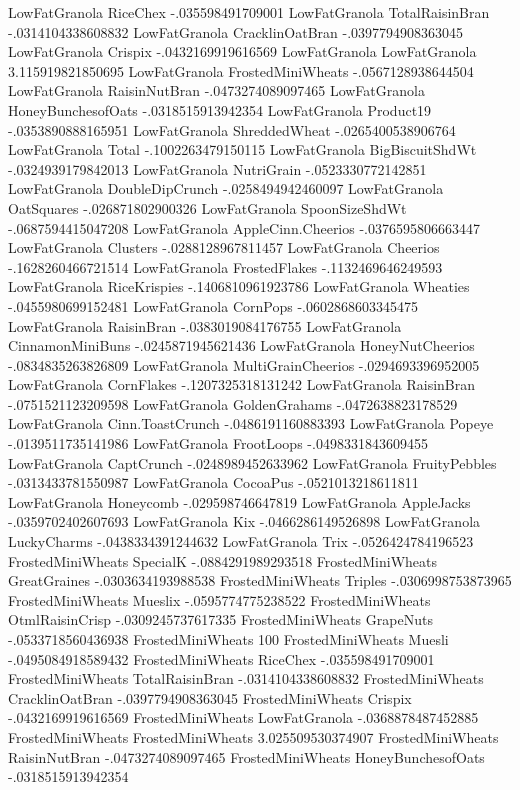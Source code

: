 LowFatGranola	RiceChex	-.035598491709001
LowFatGranola	TotalRaisinBran	-.0314104338608832
LowFatGranola	CracklinOatBran	-.0397794908363045
LowFatGranola	Crispix	-.0432169919616569
LowFatGranola	LowFatGranola	3.115919821850695
LowFatGranola	FrostedMiniWheats	-.0567128938644504
LowFatGranola	RaisinNutBran	-.0473274089097465
LowFatGranola	HoneyBunchesofOats	-.0318515913942354
LowFatGranola	Product19	-.0353890888165951
LowFatGranola	ShreddedWheat	-.0265400538906764
LowFatGranola	Total	-.1002263479150115
LowFatGranola	BigBiscuitShdWt	-.0324939179842013
LowFatGranola	NutriGrain	-.0523330772142851
LowFatGranola	DoubleDipCrunch	-.0258494942460097
LowFatGranola	OatSquares	-.026871802900326
LowFatGranola	SpoonSizeShdWt	-.0687594415047208
LowFatGranola	AppleCinn.Cheerios	-.0376595806663447
LowFatGranola	Clusters	-.0288128967811457
LowFatGranola	Cheerios	-.1628260466721514
LowFatGranola	FrostedFlakes	-.1132469646249593
LowFatGranola	RiceKrispies	-.1406810961923786
LowFatGranola	Wheaties	-.0455980699152481
LowFatGranola	CornPops	-.0602868603345475
LowFatGranola	RaisinBran	-.0383019084176755
LowFatGranola	CinnamonMiniBuns	-.0245871945621436
LowFatGranola	HoneyNutCheerios	-.0834835263826809
LowFatGranola	MultiGrainCheerios	-.0294693396952005
LowFatGranola	CornFlakes	-.1207325318131242
LowFatGranola	RaisinBran	-.0751521123209598
LowFatGranola	GoldenGrahams	-.0472638823178529
LowFatGranola	Cinn.ToastCrunch	-.0486191160883393
LowFatGranola	Popeye	-.0139511735141986
LowFatGranola	FrootLoops	-.0498331843609455
LowFatGranola	CaptCrunch	-.0248989452633962
LowFatGranola	FruityPebbles	-.0313433781550987
LowFatGranola	CocoaPus	-.0521013218611811
LowFatGranola	Honeycomb	-.029598746647819
LowFatGranola	AppleJacks	-.0359702402607693
LowFatGranola	Kix	-.0466286149526898
LowFatGranola	LuckyCharms	-.0438334391244632
LowFatGranola	Trix	-.0526424784196523
FrostedMiniWheats	SpecialK	-.0884291989293518
FrostedMiniWheats	GreatGraines	-.0303634193988538
FrostedMiniWheats	Triples	-.0306998753873965
FrostedMiniWheats	Mueslix	-.0595774775238522
FrostedMiniWheats	OtmlRaisinCrisp	-.0309245737617335
FrostedMiniWheats	GrapeNuts	-.0533718560436938
FrostedMiniWheats	100%
FrostedMiniWheats	Muesli	-.0495084918589432
FrostedMiniWheats	RiceChex	-.035598491709001
FrostedMiniWheats	TotalRaisinBran	-.0314104338608832
FrostedMiniWheats	CracklinOatBran	-.0397794908363045
FrostedMiniWheats	Crispix	-.0432169919616569
FrostedMiniWheats	LowFatGranola	-.0368878487452885
FrostedMiniWheats	FrostedMiniWheats	3.025509530374907
FrostedMiniWheats	RaisinNutBran	-.0473274089097465
FrostedMiniWheats	HoneyBunchesofOats	-.0318515913942354
